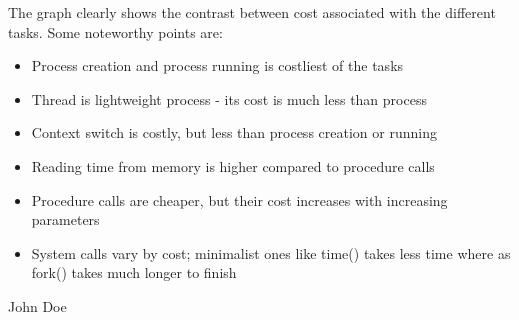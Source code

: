 \documentclass[conference]{IEEEtran}
\begin{document}
The graph clearly shows the contrast between cost associated with the different tasks.
Some noteworthy points are:
\begin{itemize}

\item
Process creation and process running is costliest of the tasks

\item
Thread is lightweight process - its cost is much less than process

\item
Context switch is costly, but less than process creation or running

\item
Reading time from memory is higher compared to procedure calls 

\item
Procedure calls are cheaper, but their cost increases with increasing parameters

\item
System calls vary by cost; minimalist ones like time() takes less time where as fork() takes much longer to finish

\end{itemize}









\ifCLASSOPTIONcaptionsoff
  \newpage
\fi







\begin{IEEEbiography}{John Doe}
\blindtext
\end{IEEEbiography}






\end{document}
